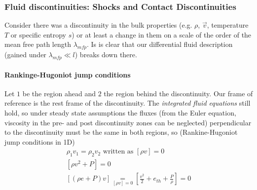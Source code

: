 \subsubsection*{Fluid discontinuities: Shocks and Contact Discontinuities}
Consider there was a discontinuity in the bulk properties (e.g. $\rho$, $\vec{v}$, temperature $T$
or specific entropy $s$) or at least a change in them on a scale of the order of the mean free path length $\lambda_{mfp}$.
Is is clear that our differential fluid description (gained under $\lambda_{mfp} \ll l$)
breaks down there. 
\paragraph*{Rankinge-Hugoniot jump conditions} Let $1$ be the region ahead and $2$ the region
behind the discontinuity. Our frame of reference is the rest frame
of the discontinuity. The \textit{integrated fluid equations} still hold, so under
steady state assumptions the fluxes (from the Euler equation, viscosity in the pre- and
post discontinuity zones can be neglected) perpendicular to the discontinuity must be the same
in both regions, so (Rankine-Hugoniot jump conditions in 1D)
\begin{equation}
    \begin{gathered}
        \rho_1 v_1 = \rho_2 v_2 \text{ written as } [\rho v] = 0 \\
        [\rho v^2 + P] = 0 \\
        [(\rho e + P)v] \underset{[\rho v] = 0}{=} \left[ \frac{v^2}{2} + e_{th} + \frac{P}{\rho} \right] = 0
    \end{gathered}
\end{equation}
